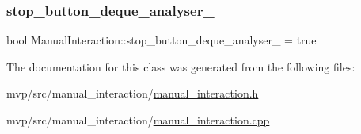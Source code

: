 \mbox{\label{classManualInteraction_a6f70c5fb6ba8b34a2c1af7be33164e06}} 
\subsubsection{\texorpdfstring{stop\+\_\+button\+\_\+deque\+\_\+analyser\+\_\+}{stop\_button\_deque\_analyser\_}}
{\footnotesize\ttfamily bool Manual\+Interaction\+::stop\+\_\+button\+\_\+deque\+\_\+analyser\+\_\+ = true\hspace{0.3cm}{\ttfamily [private]}}



The documentation for this class was generated from the following files\+:\begin{DoxyCompactItemize}
\item 
mvp/src/manual\+\_\+interaction/\hyperlink{manual__interaction_8h}{manual\+\_\+interaction.\+h}\item 
mvp/src/manual\+\_\+interaction/\hyperlink{manual__interaction_8cpp}{manual\+\_\+interaction.\+cpp}\end{DoxyCompactItemize}
